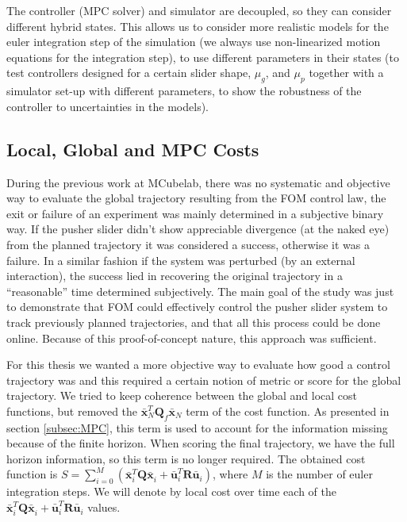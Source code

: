 \documentclass[12,twoside]{TFG-GM}
\theoremstyle{definition}
\theoremstyle{remark}
\newcommand*\diff[1]{\bar{#1}}
\begin{document}
The controller (MPC solver) and simulator are decoupled, so they can consider different hybrid states. This allows us to consider more realistic models for the euler integration step of the simulation (we always use non-linearized motion equations for the integration step), to use different parameters in their states (to test controllers designed for a certain slider shape, $\mu_g$, and $\mu_p$ together with a simulator set-up with different parameters, to show the robustness of the controller to uncertainties in the models).

\subsection{Local, Global and MPC Costs}
\label{subsec:costfunc}
During the previous work at MCubelab, there was no systematic and objective way to evaluate the global trajectory resulting from the FOM control law, the exit or failure of an experiment was mainly determined in a subjective binary way. If the pusher slider didn’t show appreciable divergence (at the naked eye) from the planned trajectory it was considered a success, otherwise it was a failure. In a similar fashion if the system was perturbed (by an external interaction), the success lied in recovering the original trajectory in a “reasonable” time determined subjectively. The main goal of the study was just to demonstrate that FOM could effectively control the pusher slider system to track previously planned trajectories, and that all this process could be done online. Because of this proof-of-concept nature, this approach was sufficient.

For this thesis we wanted a more objective way to evaluate how good a control trajectory was and this required a certain notion of metric or score for the global trajectory. We tried to keep coherence between the global and local cost functions, but removed the $\diff{\textbf{x}}_N^T \textbf{Q}_{f}^{} \diff{\textbf{x}}_N^{}$ term of the cost function. As presented in section \ref{subsec:MPC}, this term is used to account for the information missing because of the finite horizon. When scoring the final trajectory, we have the full horizon information, so this term is no longer required. The obtained cost function is $S = \sum\limits_{i = 0}^{M}(\diff{\textbf{x}}_{i}^{T} \textbf{Q} \diff{\textbf{x}}_i^{} + \diff{\textbf{u}}_{i}^{T} \textbf{R} \diff{\textbf{u}}_i^{})$, where $M$ is the number of euler integration steps. We will denote by local cost over time each of the $\diff{\textbf{x}}_{i}^{T} \textbf{Q} \diff{\textbf{x}}_i^{} + \diff{\textbf{u}}_{i}^{T} \textbf{R} \diff{\textbf{u}}_i^{}$ values.
\end{document}
